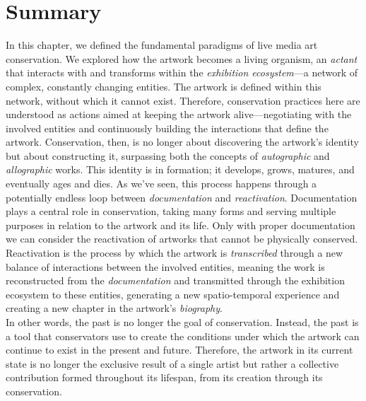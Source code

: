 \section{Summary}
In this chapter, we defined the fundamental paradigms of live media art conservation. We explored how the artwork becomes a living organism, an \textit{actant} that interacts with and transforms within the \textit{exhibition ecosystem}—a network of complex, constantly changing entities. The artwork is defined within this network, without which it cannot exist. Therefore, conservation practices here are understood as actions aimed at keeping the artwork alive—negotiating with the involved entities and continuously building the interactions that define the artwork. Conservation, then, is no longer about discovering the artwork’s identity but about constructing it, surpassing both the concepts of \textit{autographic} and \textit{allographic} works. This identity is in formation; it develops, grows, matures, and eventually ages and dies. As we’ve seen, this process happens through a potentially endless loop between \textit{documentation} and \textit{reactivation}. Documentation plays a central role in conservation, taking many forms and serving multiple purposes in relation to the artwork and its life. Only with proper documentation we can consider the reactivation of artworks that cannot be physically conserved. Reactivation is the process by which the artwork is \textit{transcribed} through a new balance of interactions between the involved entities, meaning the work is reconstructed from the \textit{documentation} and transmitted through the exhibition ecosystem to these entities, generating a new spatio-temporal experience and creating a new chapter in the artwork’s \textit{biography}.\\
In other words, the past is no longer the goal of conservation. Instead, the past is a tool that conservators use to create the conditions under which the artwork can continue to exist in the present and future. Therefore, the artwork in its current state is no longer the exclusive result of a single artist but rather a collective contribution formed throughout its lifespan, from its creation through its conservation.